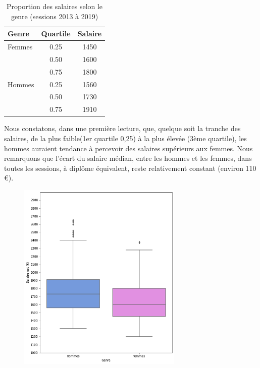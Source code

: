 \documentclass[12pt, a4paper, titlepage, table]{article}
\begin{document}
	\begin{table}[H]
		\centering
		\begin{tabular}{lcc}
			\toprule
			\textbf{Genre} & \textbf{Quartile} & \textbf{Salaire} \\
			\midrule
			Femmes & 0.25 & 1450 \\
			& 0.50 & 1600 \\
			& 0.75 & 1800 \\
			\midrule
			Hommes & 0.25 & 1560 \\
			& 0.50 & 1730 \\
			& 0.75 & 1910 \\
			\bottomrule
		\end{tabular}
		\caption{Proportion des salaires selon le genre (sessions 2013 à 2019)}
		\label{tab:quartile_salaire_genre}
	\end{table}
	
	
	Nous constatons, dans une première lecture, que, quelque soit la tranche des salaires, de la plus faible(1er quartile 0,25) à la plus élevée (3ème quartile), les hommes auraient tendance à percevoir des salaires supérieurs aux femmes. Nous remarquons que l'écart du salaire médian, entre les hommes et les femmes, dans toutes les sessions, à diplôme équivalent, reste relativement constant (environ 110 €).
		
	
	\begin{figure}[H]
		\centering
		\includegraphics[width=0.7\textwidth]{../graphs/boxplot_salaire_genre.png}
		\label{fig:boxplot_salaire_genre}
	\end{figure}
	
\end{document}
